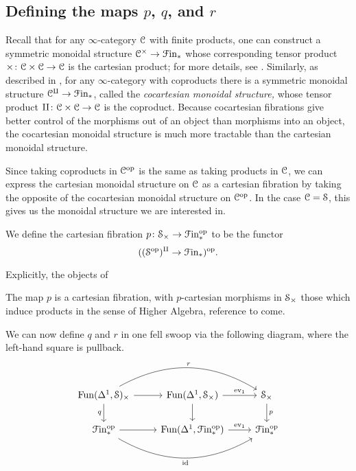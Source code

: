\documentclass[main.tex]{subfiles}
\begin{document}
\subsection{Defining the maps \texorpdfstring{$p$}{p}, \texorpdfstring{$q$}{q}, and \texorpdfstring{$r$}{r}}
\label{ssc:defining_the_maps_p_q_and_r}

Recall that for any $\infty$-category $\category{C}$ with finite products, one can construct a symmetric monoidal structure $\category{C}^{\times} \to \Finp$ whose corresponding tensor product $\times\colon \category{C} \times \category{C} \to \category{C}$ is the cartesian product; for more details, see \cite[Sec.\ 2.4.1]{luriehigheralgebra}. Similarly, as described in \cite[Sec.\ 2.4.2]{luriehigheralgebra}, for any $\infty$-category with coproducts there is a symmetric monoidal structure $\category{C}^{\amalg} \to \Finp$, called the \emph{cocartesian monoidal structure,} whose tensor product $\amalg\colon \category{C} \times \category{C} \to \category{C}$ is the coproduct. Because cocartesian fibrations give better control of the morphisms out of an object than morphisms into an object, the cocartesian monoidal structure is much more tractable than the cartesian monoidal structure.

Since taking coproducts in $\category{C}\op$ is the same as taking products in $\category{C}$, we can express the cartesian monoidal structure on $\category{C}$ as a cartesian fibration by taking the opposite of the cocartesian monoidal structure on $\category{C}\op$. In the case $\category{C} = \S$, this gives us the monoidal structure we are interested in.

\begin{definition}
  We define the cartesian fibration $p\colon \S_{\times} \to \Finp\op$ to be the functor
  \begin{equation*}
    ((\category{S}\op)^{\amalg} \to \Finp)\op.
  \end{equation*}
\end{definition}

Explicitly, the objects of 

\begin{lemma}
  The map $p$ is a cartesian fibration, with $p$-cartesian morphisms in $\S_{\times}$ those which induce products in the sense of Higher Algebra, reference to come.
\end{lemma}

We can now define $q$ and $r$ in one fell swoop via the following diagram, where the left-hand square is pullback.
\begin{equation*}
  \begin{tikzcd}
    \Fun(\Delta^{1}, \S)_{\times}
    \arrow[r]
    \arrow[rr, bend left, "r"]
    \arrow[d, swap, "q"]
    & \Fun(\Delta^{1}, \S_{\times})
    \arrow[r, "\ev_{1}"]
    \arrow[d]
    & \S_{\times}
    \arrow[d, "p"]
    \\
    \Finp\op
    \arrow[r]
    \arrow[rr, bend right, swap, "\id"]
    & \Fun(\Delta^{1}, \Finp\op)
    \arrow[r, "\ev_{1}"]
    & \Finp\op
  \end{tikzcd}
\end{equation*}
\end{document}
